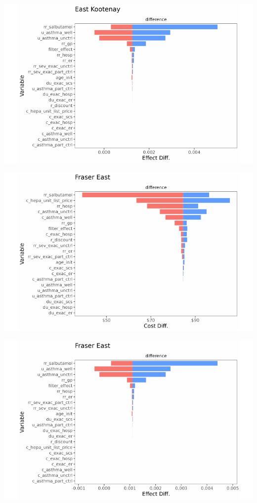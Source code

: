 \documentclass[
  number]{elsarticle}
\begin{document}
\includegraphics{index_files/figure-pdf/unnamed-chunk-9-4.pdf}

\includegraphics{index_files/figure-pdf/unnamed-chunk-9-5.pdf}

\includegraphics{index_files/figure-pdf/unnamed-chunk-9-6.pdf}
\end{document}
